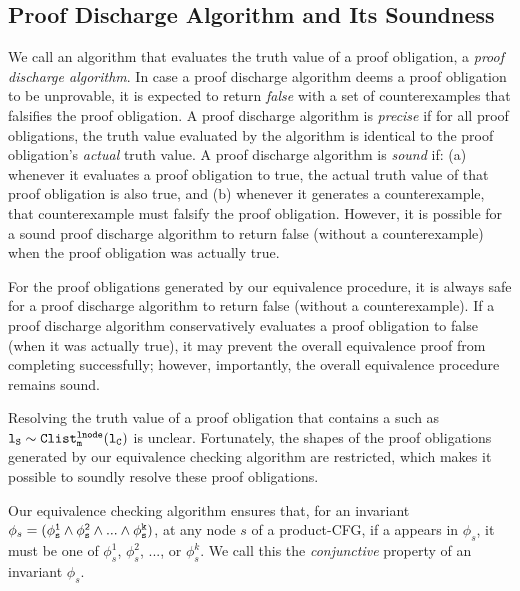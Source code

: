 \subsection{Proof Discharge Algorithm and Its Soundness}
\label{sec:proofDischarge}
We call an algorithm that evaluates the
truth value of a proof obligation, a {\em proof discharge algorithm}.
In case a proof discharge algorithm deems a proof obligation to be unprovable,
it is expected to return {\em false} with a set of counterexamples that falsifies
the proof obligation.
A proof discharge algorithm is {\em precise} if for all
proof obligations, the
truth value evaluated by the algorithm is identical to the
proof obligation's
{\em actual} truth value.
A proof discharge algorithm is {\em sound} if:
(a) whenever it evaluates a proof obligation to true, the
actual truth value of that proof obligation is also true,
and (b) whenever it generates a counterexample, that counterexample
must falsify the proof obligation.
However, it is possible for a sound proof discharge
algorithm to return false (without a counterexample)
when the proof obligation was actually true.

For
the proof obligations generated by our equivalence
procedure,
it is always safe for a proof discharge algorithm to
return false (without a counterexample).
If a proof
discharge algorithm conservatively
evaluates a proof obligation to false (when it
was actually true), it may
prevent the overall equivalence proof from completing successfully;
however, importantly, the overall equivalence procedure remains sound.

Resolving the truth value of a proof obligation that contains
a \recursiveRelation{} such as ${\tt l_{S}\sim{}Clist^{{\tt lnode}}_{m}(l_{C})}$ is unclear.
Fortunately, the shapes of the proof obligations generated
by our equivalence checking algorithm are restricted, which
makes it possible to soundly resolve these proof obligations.

Our equivalence
checking algorithm ensures that, for an invariant
$\phi_s=({\tt \phi^{1}_s \land \phi^{2}_s \land ... \land \phi^{k}_s})$,
at any node $s$
of a product-CFG,
if a \recursiveRelation{} appears in $\phi_s$, it
must be one of $\phi^{1}_s$, $\phi^{2}_s$, ..., or $\phi^{k}_s$. We call
this the {\em conjunctive \recursiveRelation{}} property of an invariant $\phi_s$.

